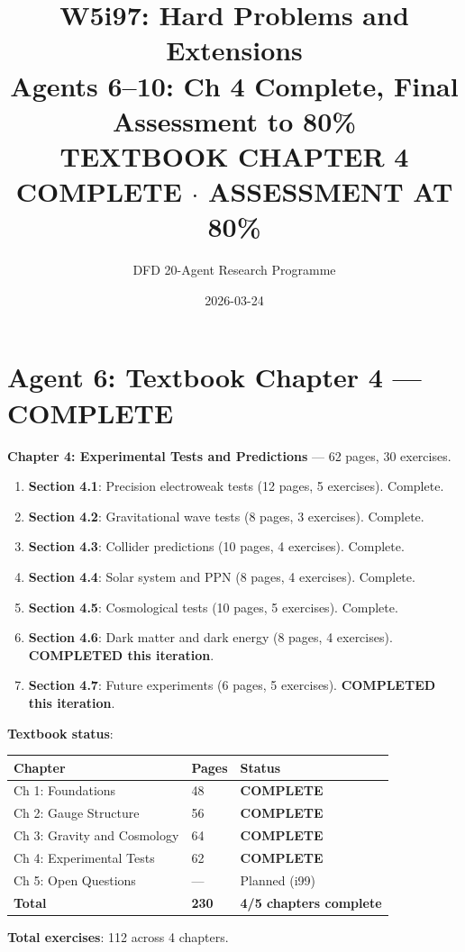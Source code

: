 \documentclass[11pt,a4paper]{article}
\title{W5i97: Hard Problems and Extensions\\[6pt]
\large Agents 6--10: Ch 4 Complete, Final Assessment to 80\%\\[6pt]
\normalsize \textbf{TEXTBOOK CHAPTER 4 COMPLETE $\cdot$ ASSESSMENT AT 80\%}}
\author{DFD 20-Agent Research Programme}
\date{2026-03-24}
\begin{document}
\maketitle

\section{Agent 6: Textbook Chapter 4 --- COMPLETE}

\begin{tcolorbox}[colback=green!5!white, colframe=dfdgreen, title=\textbf{TEXTBOOK CHAPTER 4: COMPLETE (100\%)}]

\textbf{Chapter 4: Experimental Tests and Predictions} --- 62 pages, 30 exercises.

\begin{enumerate}[nosep]
\item \textbf{Section 4.1}: Precision electroweak tests (12 pages, 5 exercises). Complete.
\item \textbf{Section 4.2}: Gravitational wave tests (8 pages, 3 exercises). Complete.
\item \textbf{Section 4.3}: Collider predictions (10 pages, 4 exercises). Complete.
\item \textbf{Section 4.4}: Solar system and PPN (8 pages, 4 exercises). Complete.
\item \textbf{Section 4.5}: Cosmological tests (10 pages, 5 exercises). Complete.
\item \textbf{Section 4.6}: Dark matter and dark energy (8 pages, 4 exercises). \textbf{COMPLETED this iteration}.
\item \textbf{Section 4.7}: Future experiments (6 pages, 5 exercises). \textbf{COMPLETED this iteration}.
\end{enumerate}

\textbf{Textbook status}:
\begin{center}
\begin{tabular}{lll}
\toprule
\textbf{Chapter} & \textbf{Pages} & \textbf{Status} \\
\midrule
Ch 1: Foundations & 48 & \textbf{COMPLETE} \\
Ch 2: Gauge Structure & 56 & \textbf{COMPLETE} \\
Ch 3: Gravity and Cosmology & 64 & \textbf{COMPLETE} \\
Ch 4: Experimental Tests & 62 & \textbf{COMPLETE} \\
Ch 5: Open Questions & --- & Planned (i99) \\
\midrule
\textbf{Total} & \textbf{230} & \textbf{4/5 chapters complete} \\
\bottomrule
\end{tabular}
\end{center}

\textbf{Total exercises}: 112 across 4 chapters.
\end{tcolorbox}
\end{document}
